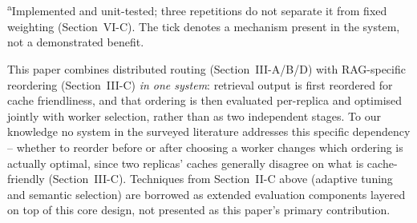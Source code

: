 \documentclass[conference]{IEEEtran}
\begin{document}
\begin{table}[h]
\caption{Related work compared along three axes}
\label{tab:relatedwork}
\centering
{}
\\[2pt]
{\footnotesize \textsuperscript{a}Implemented and unit-tested; three repetitions do
not separate it from fixed weighting (Section~VI-C). The tick denotes a
mechanism present in the system, not a demonstrated benefit.}
\end{table}

This paper combines distributed routing (Section~III-A/B/D) with
RAG-specific reordering (Section~III-C) \emph{in one system}:
retrieval output is first reordered for cache friendliness, and that
ordering is then evaluated per-replica and optimised jointly with
worker selection, rather than as two independent stages. To our
knowledge no system in the surveyed literature addresses this
specific dependency -- whether to reorder before or after choosing a
worker changes which ordering is actually optimal, since two replicas'
caches generally disagree on what is cache-friendly (Section~III-C).
Techniques from Section~II-C above (adaptive tuning and semantic
selection) are borrowed as extended evaluation components layered on
top of this core design, not presented as this paper's primary
contribution.
\end{document}
